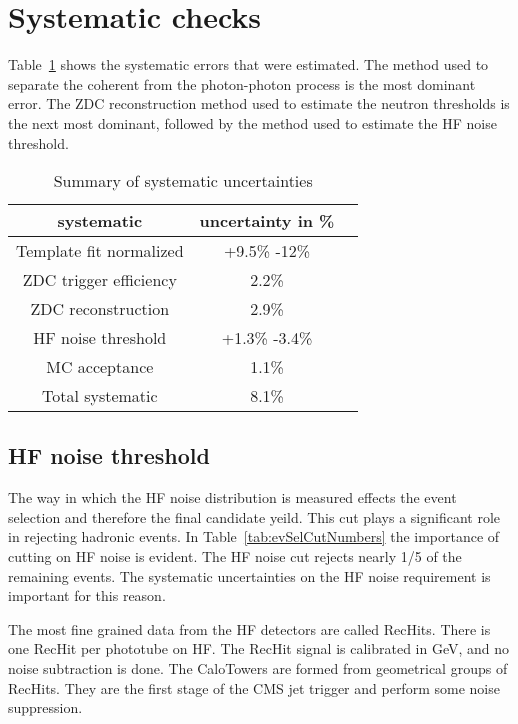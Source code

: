   \section{\label{sec:sysCheck} Systematic checks}
    
    Table~\ref{tab:sumsyst} shows the systematic errors that were estimated.
    The method used to separate the coherent from the photon-photon process 
     is the most dominant error.
    The ZDC reconstruction method used to estimate the neutron thresholds 
      is the next most dominant, followed by the method used to estimate
      the HF noise threshold. 
    
    \begin{table}[!Hhtb]
      \begin{center}
        \begin{tabular}{|c|c|c|}
          \hline
          systematic & uncertainty in \%  \\ \hline
          Template fit normalized & +9.5\% -12\%    \\ \hline
          ZDC trigger efficiency & 2.2\%    \\ \hline
          ZDC reconstruction  & 2.9\%  \\ \hline
          HF noise threshold & +1.3\% -3.4\%    \\ \hline 
          MC acceptance & 1.1\%    \\ \hline
          \hline \hline
          Total systematic & 8.1\%    \\ \hline
        \end{tabular}
        \caption{Summary of systematic uncertainties}
        \label{tab:sumsyst}
      \end{center}
    \end{table}

    \subsection{HF noise threshold}
      The way in which the HF noise distribution is measured effects the event 
        selection and therefore the final candidate yeild.
      This cut plays a significant role in rejecting hadronic events.
      In Table~\ref{tab:evSelCutNumbers} the importance of cutting on HF noise
        is evident. 
      The HF noise cut rejects nearly 1/5 of the remaining events. 
      The systematic uncertainties on the HF noise requirement is important for
        this reason.
     
      The most fine grained data from the HF detectors are called RecHits. 
      There is one RecHit per phototube on HF. 
      The RecHit signal is calibrated in GeV, and no noise subtraction is done. 
      The CaloTowers are formed from geometrical groups of RecHits. 
      They are the first stage of the CMS jet trigger and perform some noise 
        suppression.

